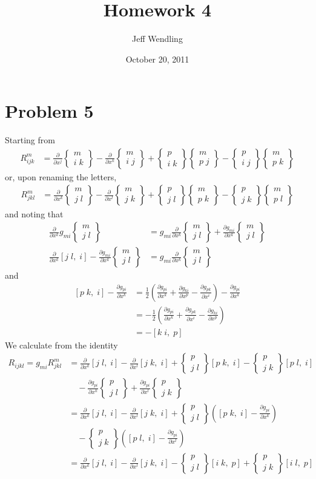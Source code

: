 \documentclass[12pt]{article}
\title{Homework 4}
\author{Jeff Wendling}
\date{October 20, 2011}
\newcommand{\eq}[1]{\begin{align*}#1\end{align*}}
\newcommand{\p}[2]{\frac{\partial#1}{\partial#2}}
\newcommand{\crsf}[3]{\left[#1\;#2,\;#3\right]}
\newcommand{\crss}[3]{\left\{\begin{array}{c}#1\\#2\;#3\end{array}\right\}}
\begin{document}
\maketitle
\section*{Problem 5}
Starting from
\eq{
	R_{ijk}^m &= \p{}{x^j}\crss{m}{i}{k} - \p{}{x^k}\crss{m}{i}{j} + \crss{p}{i}{k}\crss{m}{p}{j} - \crss{p}{i}{j}\crss{m}{p}{k}
}
or, upon renaming the letters,
\eq{
	R_{jkl}^m &= \p{}{x^k}\crss{m}{j}{l} - \p{}{x^l}\crss{m}{j}{k} + \crss{p}{j}{l}\crss{m}{p}{k} - \crss{p}{j}{k}\crss{m}{p}{l}
}
and noting that
\eq{
	\p{}{x^k}g_{mi}\crss{m}{j}{l} &= g_{mi}\p{}{x^k}\crss{m}{j}{l} + \p{g_{mi}}{x^k}\crss{m}{j}{l}\\
	\p{}{x^k}\crsf{j}{l}{i} - \p{g_{mi}}{x^k}\crss{m}{j}{l} &= g_{mi}\p{}{x^k}\crss{m}{j}{l}
}
and
\eq{
	\crsf{p}{k}{i} - \p{g_{pi}}{x^k} &= \frac{1}{2}\left(\p{g_{pi}}{x^k} + \p{g_{ki}}{x^p} - \p{g_{pk}}{x^i}\right) - \p{g_{pi}}{x^k}\\
	&= -\frac{1}{2}\left(\p{g_{pi}}{x^k} + \p{g_{pk}}{x^i} - \p{g_{ki}}{x^p}\right)\\
	&= -\crsf{k}{i}{p}
}
We calculate from the identity
\eq{
	R_{ijkl} = g_{mi} R_{jkl}^m &= \p{}{x^k}\crsf{j}{l}{i} - \p{}{x^l}\crsf{j}{k}{i} + \crss{p}{j}{l}\crsf{p}{k}{i} - \crss{p}{j}{k}\crsf{p}{l}{i}\\
	&\quad - \p{g_{pi}}{x^k}\crss{p}{j}{l} + \p{g_{pi}}{x^l}\crss{p}{j}{k}\\
	&= \p{}{x^k}\crsf{j}{l}{i} - \p{}{x^l}\crsf{j}{k}{i} + \crss{p}{j}{l}\left(\crsf{p}{k}{i} - \p{g_{pi}}{x^k}\right)\\
	&\quad - \crss{p}{j}{k}\left(\crsf{p}{l}{i} - \p{g_{pi}}{x^l}\right) \\
	&= \p{}{x^k}\crsf{j}{l}{i} - \p{}{x^l}\crsf{j}{k}{i} - \crss{p}{j}{l}\crsf{i}{k}{p} + \crss{p}{j}{k}\crsf{i}{l}{p}
}
\end{document}
